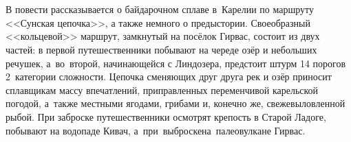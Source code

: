 \chapter*{}

В повести рассказывается о байдарочном сплаве в~Карелии по маршруту <<Сунская цепочка>>\cite{Шилов}, а также немного о предыстории. Своеобразный <<кольцевой>> маршрут, замкнутый на посёлок Гирвас, состоит из двух частей: в первой путешественники побывают на череде озёр и небольших речушек, а~во~второй, начинающейся с Линдозера, предстоит штурм 14 порогов 2~категории сложности. Цепочка сменяющих друг друга рек и озёр приносит сплавщикам массу впечатлений, приправленных переменчивой карельской погодой, а~также местными ягодами, грибами и, конечно же, свежевыловленной рыбой. При заброске путешественники осмотрят крепость в Старой Ладоге, побывают на водопаде Кивач, а~при~выброске\mdash на~палеовулкане Гирвас.


